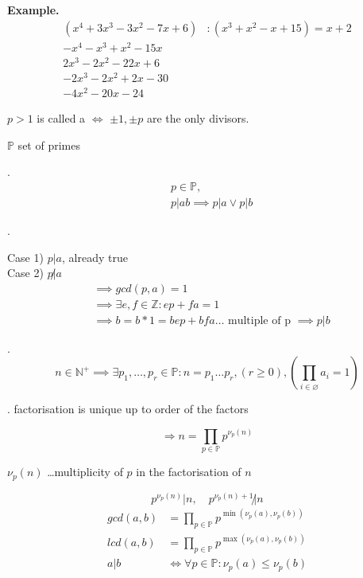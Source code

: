 \textbf{Example.}
\begin{align*}
  (x^4 + 3x^3 - 3x^2 - 7x + 6) &: ( x^3 + x^2 - x + 15) = x+2 \\
  -x^4 - x^3 + x^2 - 15 x \\
  \hline 
    2x^3 - 2x^2 - 22 x + 6 \\
    -2x^3 - 2x^2 + 2 x -30 \\ 
    \hline
      -4x^2 - 20 x - 24
\end{align*}

\begin{definition}
$p>1$ is called a  $\iff$ $\pm 1, \pm p$ are the only divisors.

$\mathbb{P}$ set of primes
\end{definition}

\Theorem.
\begin{align*}
  & p\in \mathbb{P}, \\
  & p|ab \implies p|a \vee p|b
\end{align*}

\Proof.

Case 1) $p|a$, already true\\
Case 2) $p \not| a$
\begin{align*}
  &\implies gcd(p,a) = 1 \\
  &\implies \exists e,f \in \mathbb{Z}: ep + fa = 1 \\
  &\implies b = b*1 = b e p + b f a \ldots \text{ multiple of p } \implies p|b
\end{align*}

\Theorem.
\[
  n \in \mathbb{N}^{+} \implies \exists p_1, \ldots ,p_r \in \mathbb{P}: n = p_1 \ldots p_r, (r \geq 0), (\prod_{i\in \varnothing} a_i = 1)
\]

\Remark.
factorisation is unique up to order of the factors

\[
  \Rightarrow n = \prod_{p \in \mathbb{P}} p^{\nu_p(n)}
\]

$\nu_p(n)$ \ldots multiplicity of $p$ in the factorisation of $n$

\[
  p^{\nu_p(n)} | n, \quad p^{\nu_p(n)+1} \not| n
\]
\begin{align*}
  gcd(a,b) &= \prod_{p \in \mathbb{P}} p ^{\min(\nu_p(a), \nu_p(b))} \\
  lcd(a,b) &= \prod_{p \in \mathbb{P}} p ^{\max(\nu_p(a), \nu_p(b))} \\
  a|b &\iff \forall p \in \mathbb{P} : \nu_p(a) \leq \nu_p(b)
\end{align*}

